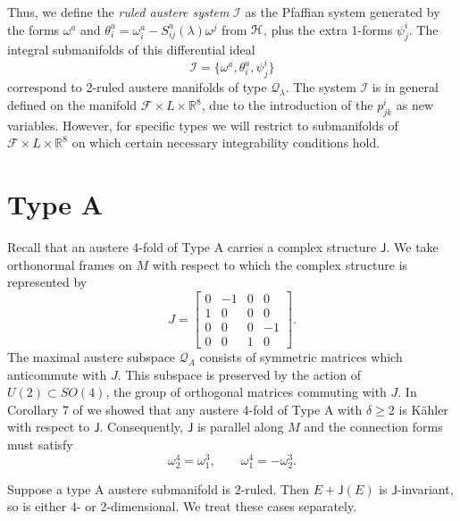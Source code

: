 \documentclass[12pt,reqno]{amsart}
\theoremstyle{definition}
\theoremstyle{remark}
\begin{document}
Thus, we define the {\em ruled austere system} ${{\mathcal I}}$ as the Pfaffian system
 generated by the forms $\omega^a$ and
$\theta^a_i=\omega^a_i - S^a_{ij}(\lambda){\omega}^j$ from ${{\EuScript H}}$, plus the extra
1-forms $\psi^i_j$.
The integral submanifolds of this differential ideal
\begin{equation}\label{idealI}
 {{\mathcal I}}=\{ \omega^a, \theta^a_i, \psi_j^i\}
\end{equation}
correspond to 2-ruled austere manifolds of type ${\mathcal Q}_\lambda$.
The system ${{\mathcal I}}$ is in general defined on the manifold ${\mathscr F}\times L \times {\mathbb R}^8$, due to
the introduction of the $p^i_{jk}$ as new variables.  However, for specific
types we will restrict to submanifolds of ${\mathscr F}\times L \times {\mathbb R}^8$ on which certain necessary integrability
conditions hold.

\section{Type A}\label{typeApart}
Recall that an austere 4-fold of Type A carries a complex structure ${\mathsf J}$.  We take orthonormal
frames on $M$ with respect to which the complex structure is represented by
$$J = \begin{bmatrix} 0 & -1 & 0 & 0 \\ 1 & 0 & 0 & 0 \\ 0 & 0 & 0 & -1 \\ 0 & 0 & 1 & 0\end{bmatrix}.$$
The maximal austere subspace ${\mathcal Q}_A$ consists of symmetric matrices which anticommute with
$J$.  This subspace is preserved by the action of $U(2)\subset SO(4)$, the group of orthogonal
matrices commuting with $J$.
In Corollary 7 of \cite{ayeaye} we showed that any austere 4-fold of Type A
with $\delta \ge 2$ is K\"ahler with respect to ${\mathsf J}$.  Consequently, ${\mathsf J}$ is parallel along $M$
and the connection forms must satisfy
\begin{equation}\label{Kahlerconn}
{\omega}^4_2 = {\omega}^3_1, \qquad {\omega}^4_1 = -{\omega}^3_2.
\end{equation}

Suppose a type A austere submanifold is 2-ruled.
Then $E + {\mathsf J}(E)$ is ${\mathsf J}$-invariant, so is either 4- or 2-dimensional.  We treat these
cases separately.
\end{document}
